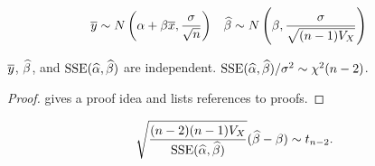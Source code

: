 \documentclass[a4paper, 12pt, fleqn]{article}
\newcommand*{\SSE}{\mathrm{SSE}}
\begin{document}
\begin{lemma}
\begin{align*}
\overline{y} &\sim N\left(\alpha + \beta\overline{x}, \frac{\sigma}{\sqrt{n}}\right)
& \widehat{\beta} &\sim N\left(\beta, \frac{\sigma}{\sqrt{(n-1)V_X}}\right)
\end{align*}
\end{lemma}

\begin{lemma}
$\overline{y}$, $\widehat{\beta}$, and $\SSE(\alphahat, \betahat)$ are independent.
$\SSE(\alphahat, \betahat)/\sigma^2 \sim \chi^2(n-2)$.
\end{lemma}
\begin{proof}
\cite{psu.stat415.regci} gives a proof idea and lists references to proofs.
\end{proof}

\begin{lemma}
\[ \sqrt{\frac{(n-2)(n-1)V_X}{\SSE(\alphahat, \betahat)}}(\betahat - \beta) \sim t_{n-2}. \]
\end{lemma}



\end{document}
